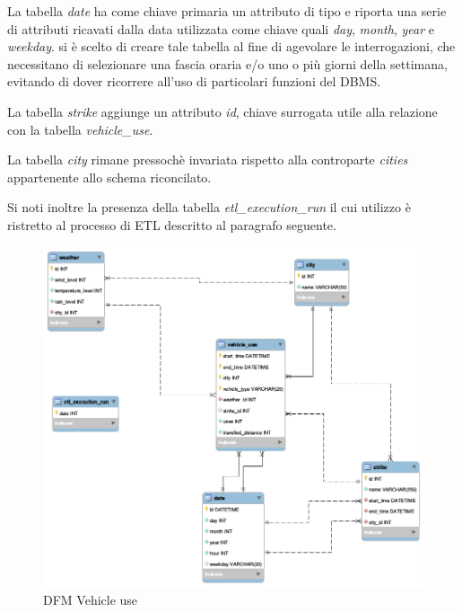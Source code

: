 La tabella \textit{date} ha come chiave primaria un attributo di tipo
 e riporta una serie di attributi ricavati dalla data utilizzata
come chiave quali \textit{day}, \textit{month}, \textit{year} e
\textit{weekday}.
si è scelto di creare tale tabella al fine di agevolare le interrogazioni, che
necessitano di selezionare una fascia oraria e/o uno o più giorni della
settimana, evitando di dover ricorrere all'uso di particolari funzioni del DBMS.

La tabella \textit{strike} aggiunge un attributo \textit{id}, chiave surrogata 
utile alla relazione con la tabella \textit{vehicle\_use}.

La tabella \textit{city} rimane pressochè invariata rispetto alla controparte
\textit{cities} appartenente allo schema riconcilato.

Si noti inoltre la presenza della tabella \textit{etl\_execution\_run} il cui
utilizzo è ristretto al processo di ETL descritto al paragrafo seguente.

\begin{figure}[H]                                                                                                                                                            
\centering                                                                                                                                                                   
\includegraphics[width=\textwidth]{diagrams/logic}                                                                                                                                   
\caption{DFM Vehicle use}                                                                                                                                            
\label{fig:logic}                                                                                                                                                           
\end{figure}

